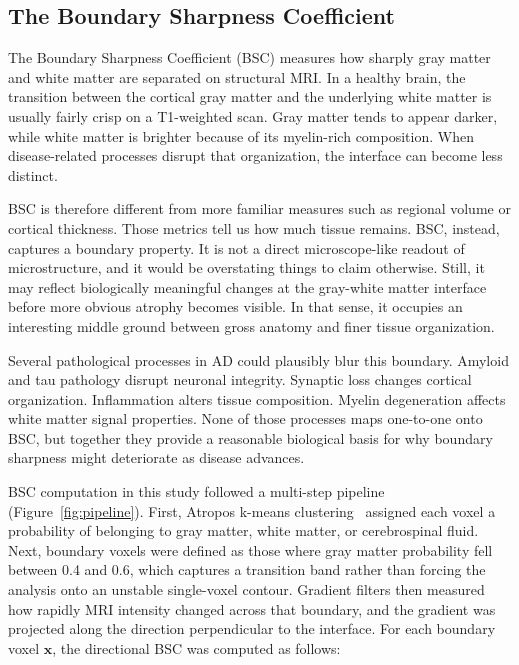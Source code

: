 \documentclass[blue]{ludusofficial}  %
\begin{document}
\subsection{The Boundary Sharpness Coefficient}

The Boundary Sharpness Coefficient (BSC) measures how sharply gray matter and white matter are separated on structural MRI. In a healthy brain, the transition between the cortical gray matter and the underlying white matter is usually fairly crisp on a T1-weighted scan. Gray matter tends to appear darker, while white matter is brighter because of its myelin-rich composition. When disease-related processes disrupt that organization, the interface can become less distinct.

BSC is therefore different from more familiar measures such as regional volume or cortical thickness. Those metrics tell us how much tissue remains. BSC, instead, captures a boundary property. It is not a direct microscope-like readout of microstructure, and it would be overstating things to claim otherwise. Still, it may reflect biologically meaningful changes at the gray-white matter interface before more obvious atrophy becomes visible. In that sense, it occupies an interesting middle ground between gross anatomy and finer tissue organization.

Several pathological processes in AD could plausibly blur this boundary. Amyloid and tau pathology disrupt neuronal integrity. Synaptic loss changes cortical organization. Inflammation alters tissue composition. Myelin degeneration affects white matter signal properties. None of those processes maps one-to-one onto BSC, but together they provide a reasonable biological basis for why boundary sharpness might deteriorate as disease advances.

BSC computation in this study followed a multi-step pipeline (Figure~\ref{fig:pipeline}). First, Atropos k-means clustering~\cite{avants2011atropos} assigned each voxel a probability of belonging to gray matter, white matter, or cerebrospinal fluid. Next, boundary voxels were defined as those where gray matter probability fell between 0.4 and 0.6, which captures a transition band rather than forcing the analysis onto an unstable single-voxel contour. Gradient filters then measured how rapidly MRI intensity changed across that boundary, and the gradient was projected along the direction perpendicular to the interface. For each boundary voxel $\mathbf{x}$, the directional BSC was computed as follows:
\end{document}
